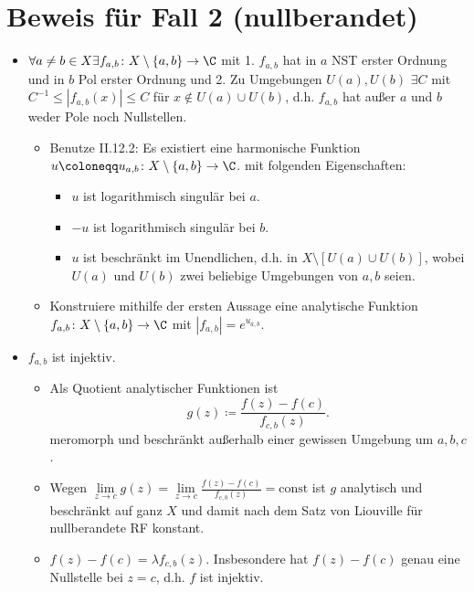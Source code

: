 \documentclass{article}
\begin{document}
        \section{Beweis für Fall 2 (nullberandet)}
        \begin{itemize}
            \item $\forall a \neq b \in X \exists f_{a,b} \colon X \setminus \{a,b\} \to \C$ mit 1. $f_{a,b}$ hat in $a$ NST erster Ordnung und in $b$ Pol erster Ordnung und 2. Zu Umgebungen $U(a), U(b)$ $\exists C$ mit $C^{-1} \leq |f_{a,b}(x)| \leq C$ für $x \notin U(a) \cup U(b)$, d.h. $f_{a,b}$ hat außer $a$ und $b$ weder Pole noch Nullstellen.
            \begin{itemize}
                \item Benutze II.12.2: Es existiert eine harmonische Funktion
                $u \coloneqq u_{a,b} \colon X \setminus \{a, b\} \to \C$.
                mit folgenden Eigenschaften:
                \begin{itemize}
                    \item $u$ ist logarithmisch singulär bei $a$.
                    \item $-u$ ist logarithmisch singulär bei $b$.
                    \item $u$ ist beschränkt im Unendlichen, d.h. in $X \setminus [U (a) \cup U (b)]$, wobei $U(a)$ und $U(b)$ zwei beliebige Umgebungen von $a, b$ seien.
                \end{itemize}
                \item Konstruiere mithilfe der ersten Aussage eine analytische Funktion $f_{a,b} \colon X \setminus \{a,b\} \to \C$ mit $|f_{a,b}| = e^{u_{a,b}}$.
            \end{itemize}
            \item $f_{a,b}$ ist injektiv.
            \begin{itemize}
                \item Als Quotient analytischer Funktionen ist $$g(z) \coloneqq \frac{f(z)-f(c)}{f_{c,b}(z)}.$$ meromorph und beschränkt außerhalb einer gewissen Umgebung um $a,b,c$. \item Wegen $\lim\limits_{z \to c} g(z) = \lim\limits_{z \to c} \frac{f(z) - f(c)}{f_{c,b}(z)} = \mathrm{const}$ ist $g$ analytisch und beschränkt auf ganz $X$ und damit nach dem Satz von Liouville für nullberandete RF konstant.
                \item $f(z) - f(c) = \lambda f_{c,b}(z)$. Insbesondere hat $f(z) - f(c)$ genau eine Nullstelle bei $z = c$, d.h. $f$ ist injektiv.

\end{itemize}
\end{itemize}
\end{document}
